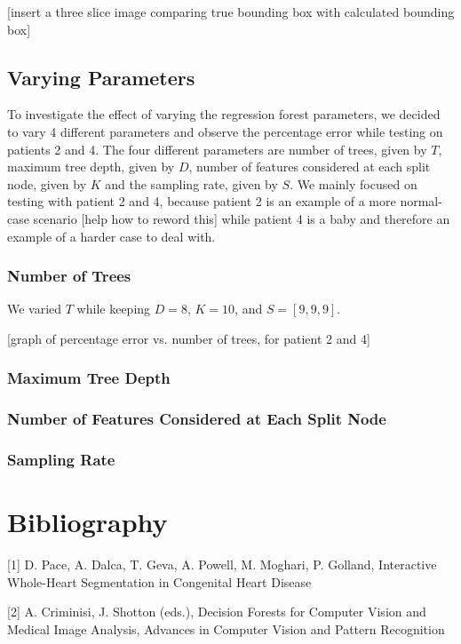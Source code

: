 [insert a three slice image comparing true bounding box with calculated bounding box]

\subsection{Varying Parameters}

To investigate the effect of varying the regression forest parameters, we decided to vary 4 different parameters and observe the percentage error while testing on patients 2 and 4. The four different parameters are number of trees, given by $T$, maximum tree depth, given by $D$, number of features considered at each split node, given by $K$ and the sampling rate, given by $S$. We mainly focused on testing with patient 2 and 4, because patient 2 is an example of a more normal-case scenario [help how to reword this] while patient 4 is a baby and therefore an example of a harder case to deal with.
\subsubsection{Number of Trees} We varied $T$ while keeping $D=8$, $K=10$, and $S=[9,9,9]$.

[graph of percentage error vs. number of trees, for patient 2 and 4]
\subsubsection{Maximum Tree Depth}
\subsubsection{Number of Features Considered at Each Split Node}
\subsubsection{Sampling Rate}


\section{Bibliography}
[1] D. Pace, A. Dalca, T. Geva, A. Powell, M. Moghari, P. Golland, Interactive Whole-Heart Segmentation in Congenital Heart Disease

[2] A. Criminisi, J. Shotton (eds.), Decision Forests for Computer Vision and Medical Image Analysis, Advances in Computer Vision and Pattern Recognition

